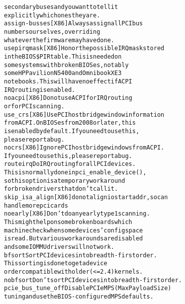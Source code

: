 \documentclass[a4paper,8pt,english]{sphinxmanual}
\begin{document}
\begin{alltt}
                                secondary buses and you want to tell it
                                explicitly which ones they are.
                assign-busses   {[}X86{]} Always assign all PCI bus
                                numbers ourselves, overriding
                                whatever the firmware may have done.
                usepirqmask     {[}X86{]} Honor the possible IRQ mask stored
                                in the BIOS \$PIR table. This is needed on
                                some systems with broken BIOSes, notably
                                some HP Pavilion N5400 and Omnibook XE3
                                notebooks. This will have no effect if ACPI
                                IRQ routing is enabled.
                noacpi          {[}X86{]} Do not use ACPI for IRQ routing
                                or for PCI scanning.
                use\_crs         {[}X86{]} Use PCI host bridge window information
                                from ACPI.  On BIOSes from 2008 or later, this
                                is enabled by default.  If you need to use this,
                                please report a bug.
                nocrs           {[}X86{]} Ignore PCI host bridge windows from ACPI.
                                If you need to use this, please report a bug.
                routeirq        Do IRQ routing for all PCI devices.
                                This is normally done in pci\_enable\_device(),
                                so this option is a temporary workaround
                                for broken drivers that don't call it.
                skip\_isa\_align  {[}X86{]} do not align io start addr, so can
                                handle more pci cards
                noearly         {[}X86{]} Don't do any early type 1 scanning.
                                This might help on some broken boards which
                                machine check when some devices' config space
                                is read. But various workarounds are disabled
                                and some IOMMU drivers will not work.
                bfsort          Sort PCI devices into breadth-first order.
                                This sorting is done to get a device
                                order compatible with older (\textless{}= 2.4) kernels.
                nobfsort        Don't sort PCI devices into breadth-first order.
                pcie\_bus\_tune\_off       Disable PCIe MPS (Max Payload Size)
                                tuning and use the BIOS-configured MPS defaults.

\end{alltt}
\end{document}
